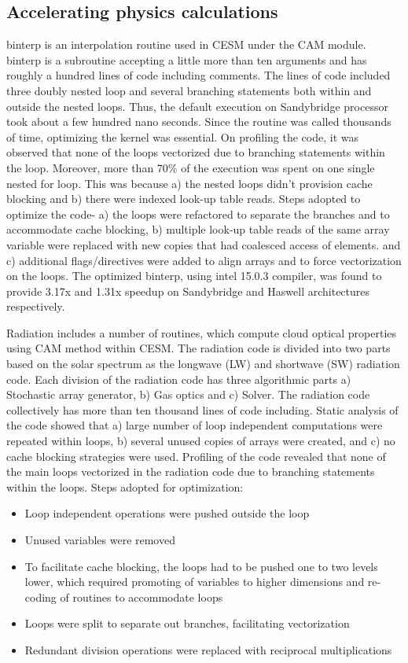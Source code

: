 \subsection{Accelerating physics calculations}\label{sec:other}

binterp is an interpolation routine used in CESM under the CAM module. binterp is a subroutine accepting a little more than ten arguments and has roughly a hundred lines of code including comments. The  lines of code included three doubly nested loop and several branching statements both within and outside the nested loops. Thus, the default execution on Sandybridge processor took about a few hundred nano seconds. Since the routine was called thousands of time, optimizing the kernel was essential.
On profiling the code, it was observed that none of the loops vectorized due to branching statements within the loop. Moreover, more than 70\% of the execution was spent on one single nested for loop. This was because a) the nested loops didn't provision cache blocking and b) there were indexed look-up table reads. Steps adopted to optimize the code- a) the loops were refactored to separate the branches and to accommodate cache blocking, b) multiple look-up table reads of the same array variable were replaced with new copies that had coalesced access of elements. and c) additional flags/directives were added to align arrays and to force vectorization on the loops. 
The optimized binterp, using intel 15.0.3 compiler, was found to provide 3.17x and 1.31x speedup on Sandybridge and Haswell architectures respectively. 

Radiation includes a number of routines, which compute cloud optical properties using CAM method within CESM. The radiation code is divided into two parts based on the solar spectrum as the longwave (LW) and shortwave (SW) radiation code. Each division of the radiation code has three algorithmic parts a) Stochastic array generator, b) Gas optics and c) Solver. The radiation code collectively has more than ten thousand lines of code including. Static analysis of the code showed that a) large number of loop independent computations were repeated within loops, b) several unused copies of arrays were created, and c) no cache blocking strategies were used. 
Profiling of the code revealed that none of the main loops vectorized in the radiation code due to branching statements within the loops. Steps adopted for optimization:
\begin {itemize}
\item {Loop independent operations were pushed outside the loop}
\item {Unused variables were removed}
\item {To facilitate cache blocking, the loops had to be pushed one to two levels lower, which required promoting of variables to higher dimensions and re-coding of routines to accommodate loops}
\item {Loops were split to separate out branches, facilitating vectorization}
\item {Redundant division operations were replaced with reciprocal multiplications}
\end{itemize}

